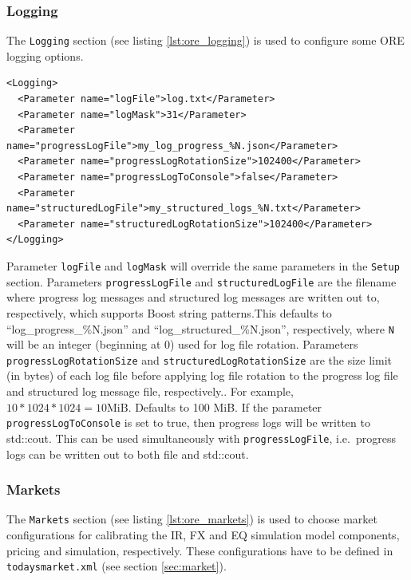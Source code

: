 \subsubsection{Logging}\label{sec:master_input_logging}
The {\tt Logging} section (see listing \ref{lst:ore_logging}) is used to configure some ORE logging options.
\begin{listing}[H]
\begin{verbatim}
<Logging>
  <Parameter name="logFile">log.txt</Parameter>
  <Parameter name="logMask">31</Parameter>
  <Parameter name="progressLogFile">my_log_progress_%N.json</Parameter>
  <Parameter name="progressLogRotationSize">102400</Parameter>
  <Parameter name="progressLogToConsole">false</Parameter>
  <Parameter name="structuredLogFile">my_structured_logs_%N.txt</Parameter>
  <Parameter name="structuredLogRotationSize">102400</Parameter>
</Logging>
\end{verbatim}
\caption{ORE logging}
\label{lst:ore_logging}
\end{listing}
Parameter {\tt logFile} and {\tt logMask} will override the same parameters in the {\tt Setup} section.
Parameters {\tt progressLogFile} and {\tt structuredLogFile} are the filename where progress log messages
and structured log messages are written out to, respectively, which supports Boost string patterns.This defaults to ``log\_progress\_\%N.json'' and ``log\_structured\_\%N.json'', respectively, where {\tt N} will be an integer (beginning at 0) used for log file rotation.
Parameters {\tt progressLogRotationSize} and {\tt structuredLogRotationSize} are the size limit (in bytes)
of each log file before applying log file rotation to the progress log file and structured log message file,
respectively.. For example, $10 * 1024 * 1024 = 10 \text{MiB}$. Defaults to 100 MiB.
If the parameter {\tt progressLogToConsole} is set to true, then progress logs will be written to std::cout.
This can be used simultaneously with {\tt progressLogFile}, i.e.\ progress logs can be written out
to both file and std::cout.

\subsubsection*{Markets}\label{sec:master_input_markets}

The {\tt Markets} section (see listing \ref{lst:ore_markets}) is used to choose market configurations for calibrating
the IR, FX and EQ simulation model components, pricing and simulation, respectively. These configurations have to be
defined in {\tt todaysmarket.xml} (see section \ref{sec:market}).

